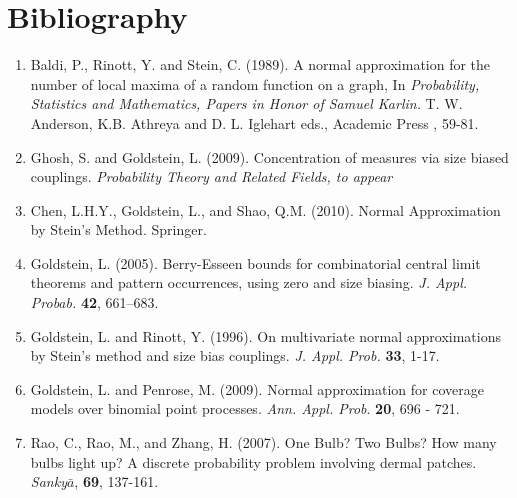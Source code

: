 \documentclass[10pt, amstex]{article}
\begin{document}
\section*{Bibliography}
\begin{enumerate}

\item \label{BRS} Baldi, P., Rinott, Y.  and Stein, C.  (1989).
A normal approximation for  the number of local maxima of a random
function on a graph, In {\em Probability, Statistics and Mathematics,
Papers in Honor of Samuel Karlin.}  T. W. Anderson, K.B. Athreya
and D. L. Iglehart eds., Academic Press , 59-81.



\item \label{GhGo} Ghosh, S. and Goldstein, L. (2009). Concentration of measures via size biased couplings. {\em Probability Theory and Related Fields, to appear}

\item \label{Chen} Chen, L.H.Y., Goldstein, L., and Shao, Q.M. (2010). Normal Approximation by Stein's Method.
Springer.

\item \label{Gold}
Goldstein, L. (2005).
Berry-Esseen bounds for combinatorial central limit theorems
 and pattern occurrences, using zero and size biasing.
{\em J. Appl. Probab.} {\bf 42}, 661--683.

\item \label{GR}
Goldstein, L. and Rinott, Y. (1996). On multivariate normal
approximations by Stein's method and size bias couplings. {\em J.
Appl. Prob.} {\bf 33}, 1-17.

\item \label{GolPen}
Goldstein, L. and Penrose, M. (2009). Normal approximation for coverage
 models over binomial point processes. {\em Ann. Appl. Prob}. {\bf
 20}, 696 - 721.


\item \label{rrz} Rao, C., Rao, M., and Zhang, H. (2007).
One Bulb? Two Bulbs? How many bulbs light up? A discrete probability
problem involving dermal patches. {\em Sanky$\bar{a}$}, {\bf 69},
137-161.



\end{enumerate}
\end{document}
